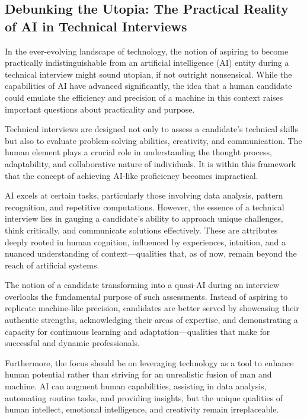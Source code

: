 \documentclass[
    a4paper, %
    10pt, %
    unnumberedsections, %
    twoside, %
]{LTJournalArticle}
\begin{document}
\subsection{Debunking the Utopia: The Practical Reality of AI in Technical Interviews}

In the ever-evolving landscape of technology, the notion of aspiring to become practically indistinguishable from an artificial intelligence (AI) entity during a technical interview might sound utopian, if not outright nonsensical. While the capabilities of AI have advanced significantly, the idea that a human candidate could emulate the efficiency and precision of a machine in this context raises important questions about practicality and purpose.

Technical interviews are designed not only to assess a candidate's technical skills but also to evaluate problem-solving abilities, creativity, and communication. The human element plays a crucial role in understanding the thought process, adaptability, and collaborative nature of individuals. It is within this framework that the concept of achieving AI-like proficiency becomes impractical.

AI excels at certain tasks, particularly those involving data analysis, pattern recognition, and repetitive computations. However, the essence of a technical interview lies in gauging a candidate's ability to approach unique challenges, think critically, and communicate solutions effectively. These are attributes deeply rooted in human cognition, influenced by experiences, intuition, and a nuanced understanding of context—qualities that, as of now, remain beyond the reach of artificial systems.

The notion of a candidate transforming into a quasi-AI during an interview overlooks the fundamental purpose of such assessments. Instead of aspiring to replicate machine-like precision, candidates are better served by showcasing their authentic strengths, acknowledging their areas of expertise, and demonstrating a capacity for continuous learning and adaptation—qualities that make for successful and dynamic professionals.

Furthermore, the focus should be on leveraging technology as a tool to enhance human potential rather than striving for an unrealistic fusion of man and machine. AI can augment human capabilities, assisting in data analysis, automating routine tasks, and providing insights, but the unique qualities of human intellect, emotional intelligence, and creativity remain irreplaceable.
\end{document}
